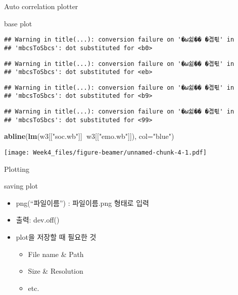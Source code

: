 \documentclass[ignorenonframetext,]{beamer}
\newenvironment{Shaded}{\begin{snugshade}}{\end{snugshade}}
\newcommand{\KeywordTok}[1]{\textcolor[rgb]{0.13,0.29,0.53}{\textbf{#1}}}
\newcommand{\DataTypeTok}[1]{\textcolor[rgb]{0.13,0.29,0.53}{#1}}
\newcommand{\StringTok}[1]{\textcolor[rgb]{0.31,0.60,0.02}{#1}}
\newcommand{\OperatorTok}[1]{\textcolor[rgb]{0.81,0.36,0.00}{\textbf{#1}}}
\newcommand{\NormalTok}[1]{#1}
\begin{document}
\begin{frame}[fragile]{Auto correlation plotter}
\begin{block}{base plot}
\begin{verbatim}
## Warning in title(...): conversion failure on '�ы쉶�� �곕튃' in
## 'mbcsToSbcs': dot substituted for <b0>
\end{verbatim}

\begin{verbatim}
## Warning in title(...): conversion failure on '�ы쉶�� �곕튃' in
## 'mbcsToSbcs': dot substituted for <eb>
\end{verbatim}

\begin{verbatim}
## Warning in title(...): conversion failure on '�ы쉶�� �곕튃' in
## 'mbcsToSbcs': dot substituted for <b9>
\end{verbatim}

\begin{verbatim}
## Warning in title(...): conversion failure on '�ы쉶�� �곕튃' in
## 'mbcsToSbcs': dot substituted for <99>
\end{verbatim}

\begin{Shaded}
\begin{Highlighting}[]
\KeywordTok{abline}\NormalTok{(}\KeywordTok{lm}\NormalTok{(w3[[}\StringTok{"soc.wb"}\NormalTok{]]}\OperatorTok{~}\NormalTok{w3[[}\StringTok{"emo.wb"}\NormalTok{]]), }\DataTypeTok{col=}\StringTok{"blue"}\NormalTok{)}
\end{Highlighting}
\end{Shaded}

\texttt{[image: Week4\_files/figure-beamer/unnamed-chunk-4-1.pdf]}

\end{block}

\end{frame}

\begin{frame}{Plotting}

\begin{block}{saving plot}

\begin{itemize}
\item
  png(``파일이름'') : 파일이름.png 형태로 입력
\item
  출력: dev.off()
\item
  plot을 저장할 때 필요한 것

  \begin{itemize}
  \item
    File name \& Path
  \item
    Size \& Resolution
  \item
    etc.
  \end{itemize}
\end{itemize}

\end{block}

\end{frame}
\end{document}
